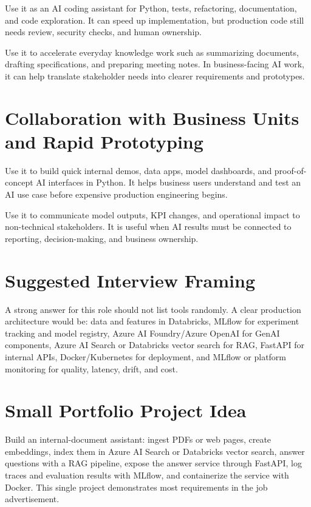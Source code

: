 \documentclass[a4paper]{article}
\begin{document}
\begin{tcolorbox}[title={GitHub Copilot}]
Use it as an AI coding assistant for Python, tests, refactoring, documentation, and code exploration.
It can speed up implementation, but production code still needs review, security checks, and human ownership.
\end{tcolorbox}

\begin{tcolorbox}[title={Microsoft 365 Copilot}]
Use it to accelerate everyday knowledge work such as summarizing documents, drafting specifications, and preparing meeting notes.
In business-facing AI work, it can help translate stakeholder needs into clearer requirements and prototypes.
\end{tcolorbox}

\section{Collaboration with Business Units and Rapid Prototyping}

\begin{tcolorbox}[title={Streamlit}]
Use it to build quick internal demos, data apps, model dashboards, and proof-of-concept AI interfaces in Python.
It helps business users understand and test an AI use case before expensive production engineering begins.
\end{tcolorbox}

\begin{tcolorbox}[title={Power BI}]
Use it to communicate model outputs, KPI changes, and operational impact to non-technical stakeholders.
It is useful when AI results must be connected to reporting, decision-making, and business ownership.
\end{tcolorbox}

\section*{Suggested Interview Framing}
A strong answer for this role should not list tools randomly. A clear production architecture would be: data and features in Databricks, MLflow for experiment tracking and model registry, Azure AI Foundry/Azure OpenAI for GenAI components, Azure AI Search or Databricks vector search for RAG, FastAPI for internal APIs, Docker/Kubernetes for deployment, and MLflow or platform monitoring for quality, latency, drift, and cost.

\section*{Small Portfolio Project Idea}
Build an internal-document assistant: ingest PDFs or web pages, create embeddings, index them in Azure AI Search or Databricks vector search, answer questions with a RAG pipeline, expose the answer service through FastAPI, log traces and evaluation results with MLflow, and containerize the service with Docker. This single project demonstrates most requirements in the job advertisement.
\end{document}
